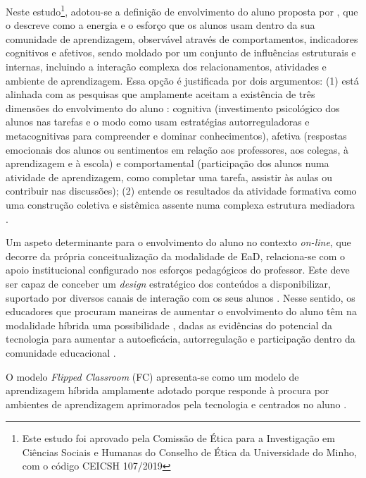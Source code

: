 \documentclass[portuguese]{textolivre}
\begin{document}
Neste estudo\footnote{Este estudo foi aprovado pela Comissão de Ética para a Investigação em Ciências Sociais e Humanas do Conselho de Ética da Universidade do Minho, com o código CEICSH 107/2019}, adotou-se a definição de envolvimento do aluno proposta por \textcite{bond_facilitating_2019}, que o descreve como a energia e o esforço que os alunos usam dentro da sua comunidade de aprendizagem, observável através de comportamentos, indicadores cognitivos e afetivos, sendo moldado por um conjunto de influências estruturais e internas, incluindo a interação complexa dos relacionamentos, atividades e ambiente de aprendizagem. Essa opção é justificada por dois argumentos: (1) está alinhada com as pesquisas que amplamente aceitam a existência de três dimensões do envolvimento do aluno \cite{fredricks_school_2004}: cognitiva (investimento psicológico dos alunos nas tarefas e o modo como usam estratégias autorreguladoras e metacognitivas para compreender e dominar conhecimentos), afetiva (respostas emocionais dos alunos ou sentimentos em relação aos professores, aos colegas, à aprendizagem e à escola) e comportamental (participação dos alunos numa atividade de aprendizagem, como completar uma tarefa, assistir às aulas ou contribuir nas discussões); (2) entende os resultados da atividade formativa como uma construção coletiva e sistêmica assente numa complexa estrutura mediadora \cite{engestrom_expansive_2001}.

Um aspeto determinante para o envolvimento do aluno no contexto \textit{on-line}, que decorre da própria conceitualização da modalidade de EaD, relaciona-se com o apoio institucional configurado nos esforços pedagógicos do professor. Este deve ser capaz de conceber um \textit{design} estratégico dos conteúdos a disponibilizar, suportado por diversos canais de interação com os seus alunos \cite{stone_online_2019}. Nesse sentido, os educadores que procuram maneiras de aumentar o envolvimento do aluno têm na modalidade híbrida uma possibilidade \cite{halverson_learner_2019}, dadas as evidências do potencial da tecnologia para aumentar a autoeficácia, autorregulação e participação dentro da comunidade educacional \cite{alioon_effect_2019}. 

O modelo \textit{Flipped Classroom} (FC) apresenta-se como um modelo de aprendizagem híbrida amplamente adotado porque responde à procura por ambientes de aprendizagem aprimorados pela tecnologia e centrados no aluno \cite{lai_multilevel_2021}. 
\end{document}
